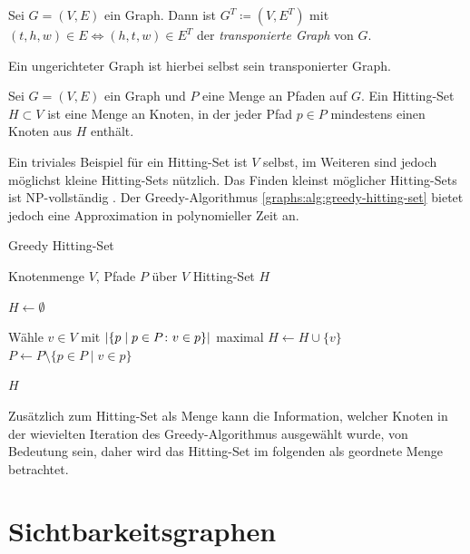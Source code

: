 \begin{definition}
  Sei $G = (V, E)$ ein Graph. Dann ist $G^T \coloneq (V, E^T)$ mit $(t, h, w) \in E \Leftrightarrow (h, t, w) \in E^T$ der \emph{transponierte Graph} von $G$.
\end{definition}

Ein ungerichteter Graph ist hierbei selbst sein transponierter Graph.

\begin{definition}
  Sei $G = (V, E)$ ein Graph und $P$ eine Menge an Pfaden auf $G$.
  Ein Hitting-Set $H \subset V$ ist eine Menge an Knoten, in der jeder Pfad $p \in P$ mindestens einen Knoten aus $H$ enthält.
\end{definition}

Ein triviales Beispiel für ein Hitting-Set ist $V$ selbst, im Weiteren sind jedoch möglichst kleine Hitting-Sets nützlich.
Das Finden kleinst möglicher Hitting-Sets ist NP-vollständig \cite{Kar72}.
Der Greedy-Algorithmus \ref{graphs:alg:greedy-hitting-set} bietet jedoch eine Approximation in polynomieller Zeit an.

\begin{algorithm}
  \caption{Greedy Hitting-Set}
  \begin{algorithmic}[1]
    \Require Knotenmenge $V$, Pfade $P$ über $V$
    \Ensure Hitting-Set $H$

    \State $H \gets \emptyset$

    \State

    \State Wähle $v \in V$ mit $\abs{ \{ p \mid p \in P \colon v \in p \}}$ maximal
    \State $H \gets H \cup \{  v \}$
    \State $P \gets P \setminus \{p \in P \mid v \in p\}$
    \EndWhile

    \State

    \State \Return $H$
  \end{algorithmic}
  \label{graphs:alg:greedy-hitting-set}
\end{algorithm}

Zusätzlich zum Hitting-Set als Menge kann die Information, welcher Knoten in der wievielten Iteration des Greedy-Algorithmus ausgewählt wurde, von Bedeutung sein, daher wird das Hitting-Set im folgenden als geordnete Menge betrachtet.


\section{Sichtbarkeitsgraphen}

